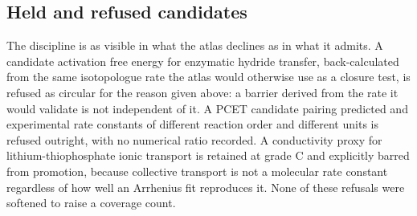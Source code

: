 \subsection{Held and refused candidates}

The discipline is as visible in what the atlas declines as in what it
admits. A candidate activation free energy for enzymatic hydride transfer,
back-calculated from the same isotopologue rate the atlas would otherwise
use as a closure test, is refused as circular for the reason given above:
a barrier derived from the rate it would validate is not independent of
it. A PCET candidate pairing predicted and experimental rate
constants of different reaction order and different units is refused
outright, with no numerical ratio recorded. A conductivity proxy for
lithium-thiophosphate ionic transport is retained at grade C and explicitly
barred from promotion, because collective transport is not a molecular rate
constant regardless of how well an Arrhenius fit reproduces it. None of
these refusals were softened to raise a coverage count.

